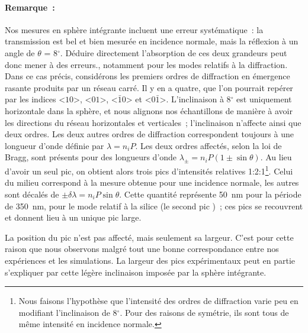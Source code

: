 \paragraph*{Remarque~:} Nos mesures en sphère intégrante incluent une erreur systématique~: la transmission est bel et bien mesurée en incidence normale, mais la réflexion à un angle de $\theta$ = 8$^\circ$. Déduire directement l'absorption de ces deux grandeurs peut donc mener à des erreurs., notamment pour les modes relatifs à la diffraction. Dans ce cas précis, considérons les premiers ordres de diffraction en émergence rasante produits par un réseau carré. Il y en a quatre, que l'on pourrait repérer par les indices <$10$>, <$01$>, <$\bar{1}0$> et <$0\bar{1}$>. L'inclinaison à 8$^\circ$ est uniquement horizontale dans la sphère, et nous alignons nos échantillons de manière à avoir les directions du réseau horizontales et verticales~; l'inclinaison n'affecte ainsi que deux ordres. Les deux autres ordres de diffraction correspondent toujours à une longueur d'onde définie par $\lambda = n_iP$. Les deux ordres affectés, selon la loi de Bragg, sont présents pour des longueurs d'onde $\lambda_\pm = n_iP(1\pm\sin\theta)$. Au lieu d'avoir un seul pic, on obtient alors trois pics d'intensités relatives {1:2:1}\footnote{Nous faisons l'hypothèse que l'intensité des ordres de diffraction varie peu en modifiant l'inclinaison de 8$^\circ$. Pour des raisons de symétrie, ils sont tous de même intensité en incidence normale.}. Celui du milieu correspond à la mesure obtenue pour une incidence normale, les autres sont décalés de $\pm\delta\lambda = n_iP\sin\theta$. Cette quantité représente 50~nm pour la période de 350~nm, pour le mode relatif à la silice (le \og second pic \fg)~; ces pics se recouvrent et donnent lieu à un unique pic large.\par
La position du pic n'est pas affecté, mais seulement sa largeur. C'est pour cette raison que nous observons malgré tout une bonne correspondance entre nos expériences et les simulations. La largeur des pics expérimentaux peut en partie s'expliquer par cette légère inclinaison imposée par la sphère intégrante.\par 
 

